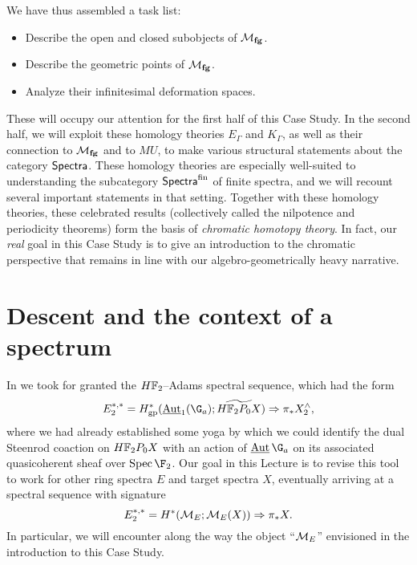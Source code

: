 We have thus assembled a task list:
\begin{itemize}
\item Describe the open and closed subobjects of $\mathcal{M}_{\mathbf{fg}}$.
\item Describe the geometric points of $\mathcal{M}_{\mathbf{fg}}$.
\item Analyze their infinitesimal deformation spaces.
\end{itemize}
These will occupy our attention for the first half of this Case Study.  In the second half, we will exploit these homology theories $E_\Gamma$ and $K_\Gamma$, as well as their connection to $\mathcal{M}_{\mathbf{fg}}$ and to $MU$, to make various structural statements about the category $\mathsf{Spectra}$.  These homology theories are especially well-suited to understanding the subcategory $\mathsf{Spectra}^{\mathrm{fin}}$ of finite spectra, and we will recount several important statements in that setting.  Together with these homology theories, these celebrated results (collectively called the nilpotence and periodicity theorems) form the basis of \textit{chromatic homotopy theory}.  In fact, our \emph{real} goal in this Case Study is to give an introduction to the chromatic perspective that remains in line with our algebro-geometrically heavy narrative.








\section{Descent and the context of a spectrum}\label{StableContextLecture}

In  we took for granted the $\HFtwo$--Adams spectral sequence, which had the form \[E_2^{*, *} = H^*_{\mathrm{gp}}(\InternalAut_1(\G_a); \widetilde{\HFtwo P_0 X}) \Rightarrow \pi_* X^\wedge_2,\] where we had already established some yoga by which we could identify the dual Steenrod coaction on $\HFtwo P_0 X$ with an action of $\InternalAut{\G_a}$ on its associated quasicoherent sheaf over $\Spec \F_2$.  Our goal in this Lecture is to revise this tool to work for other ring spectra $E$ and target spectra $X$, eventually arriving at a spectral sequence with signature \[E_2^{*, *} = H^*(\mathcal{M}_{E}; \mathcal{M}_{E}(X)) \Rightarrow \pi_* X.\]  In particular, we will encounter along the way the object ``$\mathcal{M}_{E}$'' envisioned in the introduction to this Case Study.

